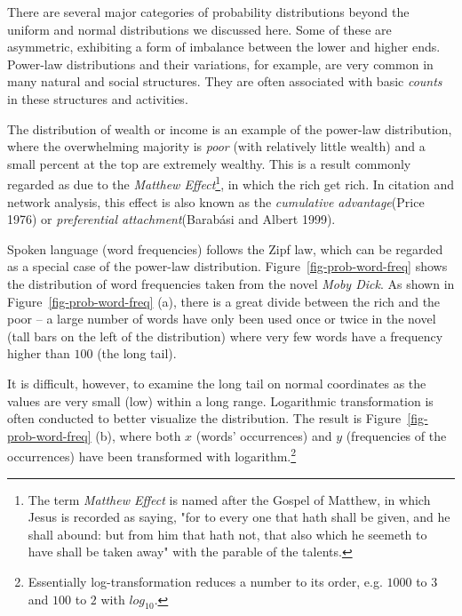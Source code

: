 \documentclass[
  letterpaper,
]{scrbook}
\begin{document}
There are several major categories of probability distributions beyond
the uniform and normal distributions we discussed here. Some of these
are asymmetric, exhibiting a form of imbalance between the lower and
higher ends. Power-law distributions and their variations, for example,
are very common in many natural and social structures. They are often
associated with basic \emph{counts} in these structures and activities.

The distribution of wealth or income is an example of the power-law
distribution, where the overwhelming majority is \emph{poor} (with
relatively little wealth) and a small percent at the top are extremely
wealthy. This is a result commonly regarded as due to the \emph{Matthew
Effect}\footnote{The term \emph{Matthew Effect} is named after the
  Gospel of Matthew, in which Jesus is recorded as saying, "for to every
  one that hath shall be given, and he shall abound: but from him that
  hath not, that also which he seemeth to have shall be taken away" with
  the parable of the talents.}, in which the rich get rich. In citation
and network analysis, this effect is also known as the \emph{cumulative
advantage}(Price 1976) or \emph{preferential attachment}(Barabási and
Albert 1999).

Spoken language (word frequencies) follows the Zipf law, which can be
regarded as a special case of the power-law distribution.
Figure~\ref{fig-prob-word-freq} shows the distribution of word
frequencies taken from the novel \emph{Moby Dick}. As shown in
Figure~\ref{fig-prob-word-freq} (a), there is a great divide between the
rich and the poor -- a large number of words have only been used once or
twice in the novel (tall bars on the left of the distribution) where
very few words have a frequency higher than \(100\) (the long tail).

It is difficult, however, to examine the long tail on normal coordinates
as the values are very small (low) within a long range. Logarithmic
transformation is often conducted to better visualize the distribution.
The result is Figure~\ref{fig-prob-word-freq} (b), where both \(x\)
(words' occurrences) and \(y\) (frequencies of the occurrences) have
been transformed with logarithm.\footnote{Essentially log-transformation
  reduces a number to its order, e.g. \(1000\) to \(3\) and \(100\) to
  \(2\) with \(log_{10}\).}
\end{document}

